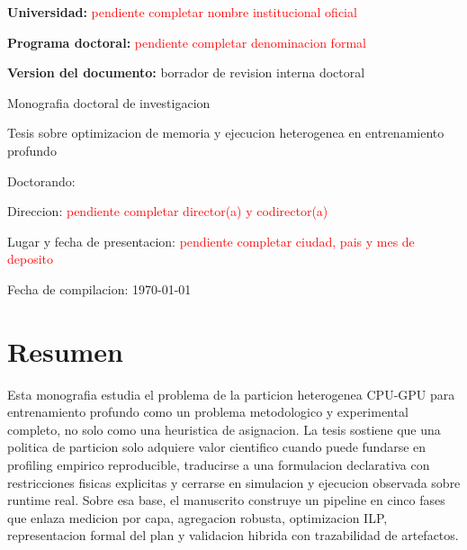 
\begin{titlepage}
\centering
{\large \textbf{Universidad:} \textcolor{red}{pendiente completar nombre institucional oficial} \par}
\vspace{0.6cm}
{\large \textbf{Programa doctoral:} \textcolor{red}{pendiente completar denominacion formal} \par}
\vspace{0.3cm}
{\large \textbf{Version del documento:} borrador de revision interna doctoral \par}
\vspace{1.6cm}
{\Huge \textbf{\ThesisTitle} \par}
\vspace{0.5cm}
{\Large Monografia doctoral de investigacion \par}
\vspace{0.4cm}
{\large Tesis sobre optimizacion de memoria y ejecucion heterogenea en entrenamiento profundo \par}
\vspace{1.2cm}
{\large Doctorando: \ThesisAuthor \par}
\vspace{0.4cm}
{\large Direccion: \textcolor{red}{pendiente completar director(a) y codirector(a)} \par}
\vspace{0.4cm}
{\large Lugar y fecha de presentacion: \textcolor{red}{pendiente completar ciudad, pais y mes de deposito} \par}
\vfill
{\large Fecha de compilacion: \today \par}
\end{titlepage}

\clearpage
{}

\chapter*{Resumen}
Esta monografia estudia el problema de la particion heterogenea CPU-GPU para entrenamiento profundo como un problema metodologico y experimental completo, no solo como una heuristica de asignacion. La tesis sostiene que una politica de particion solo adquiere valor cientifico cuando puede fundarse en profiling empirico reproducible, traducirse a una formulacion declarativa con restricciones fisicas explicitas y cerrarse en simulacion y ejecucion observada sobre runtime real. Sobre esa base, el manuscrito construye un pipeline en cinco fases que enlaza medicion por capa, agregacion robusta, optimizacion ILP, representacion formal del plan y validacion hibrida con trazabilidad de artefactos.

